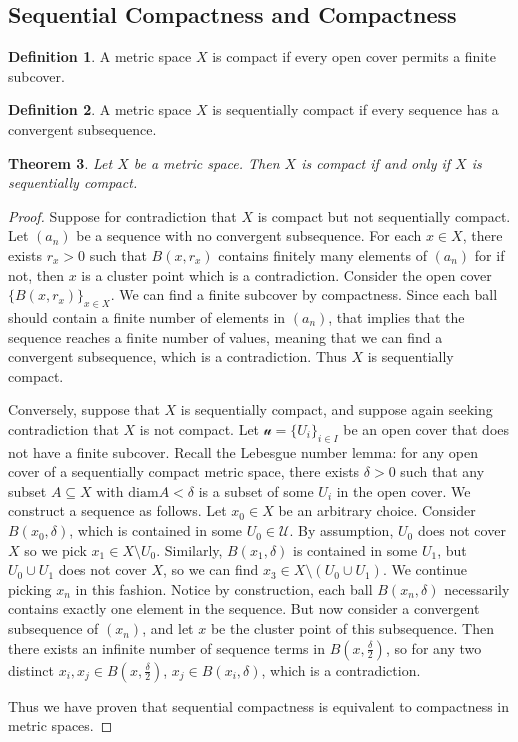 \documentclass{article}
\newcommand{\diam}{\mathrm{diam}}
\theoremstyle{plain} %
\newtheorem{thm}{Theorem}
\numberwithin{thm}{section} %
\theoremstyle{definition}
\newtheorem{defn}[thm]{Definition}
\begin{document}
    \subsection{Sequential Compactness and Compactness}
    \begin{defn}
        A metric space \(X\) is compact if every open cover permits a finite subcover.
    \end{defn}
    \begin{defn}
        A metric space \(X\) is sequentially compact if every sequence has a convergent subsequence.
    \end{defn}
    \begin{thm}
        Let \(X\) be a metric space. Then \(X\) is compact if and only if \(X\) is sequentially compact.
    \end{thm}
    \begin{proof}
        Suppose for contradiction that \(X\) is compact but not sequentially compact. Let \((a_n)\) be a sequence with no convergent subsequence. For each \(x \in X\), there exists \(r_x > 0\) such that \(B(x, r_x)\) contains finitely many elements of \((a_n)\) for if not, then \(x\) is a cluster point which is a contradiction. Consider the open cover \(\{ B(x, r_x) \}_{x \in X}\). We can find a finite subcover by compactness. Since each ball should contain a finite number of elements in \((a_n)\), that implies that the sequence reaches a finite number of values, meaning that we can find a convergent subsequence, which is a contradiction. Thus \(X\) is sequentially compact.

        Conversely, suppose that \(X\) is sequentially compact, and suppose again seeking contradiction that \(X\) is not compact. Let \(\mathcal{u} = \{ U_i \} _{i \in I}\) be an open cover that does not have a finite subcover. Recall the Lebesgue number lemma: for any open cover of a sequentially compact metric space, there exists \(\delta > 0\) such that any subset \(A \subseteq X\) with \(\diam A < \delta\) is a subset of some \(U_i\) in the open cover. We construct a sequence as follows. Let \(x_0 \in X\) be an arbitrary choice. Consider \(B(x_0, \delta)\), which is contained in some \(U_0 \in \mathcal{U}\). By assumption, \(U_0\) does not cover \(X\) so we pick \(x_1 \in X \setminus U_0\). Similarly, \(B(x_1, \delta)\) is contained in some \(U_1\), but \(U_0 \cup U_1\) does not cover \(X\), so we can find \(x_3 \in X\setminus (U_0 \cup U_1)\). We continue picking \(x_n\) in this fashion. Notice by construction, each ball \(B(x_n, \delta)\) necessarily contains exactly one element in the sequence. But now consider a convergent subsequence of \((x_n)\), and let \(x\) be the cluster point of this subsequence. Then there exists an infinite number of sequence terms in \(B(x, \frac{\delta}{2})\), so for any two distinct \(x_i, x_j \in B(x, \frac{\delta}{2})\), \(x_j \in B(x_i, \delta)\), which is a contradiction.

        Thus we have proven that sequential compactness is equivalent to compactness in metric spaces.
    \end{proof}
\end{document}
